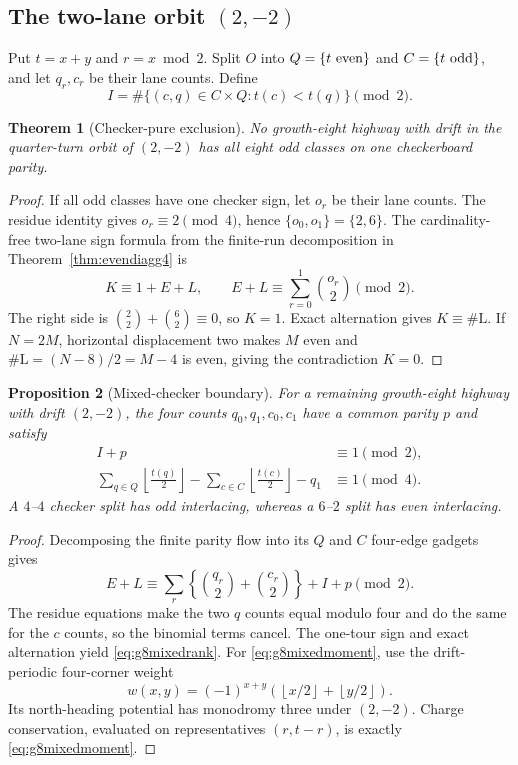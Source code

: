 \documentclass[11pt,letterpaper]{article}
\theoremstyle{plain}
\newtheorem{theorem}{Theorem}[section]
\newtheorem{proposition}[theorem]{Proposition}
\theoremstyle{definition}
\newcommand{\turnL}{\mathrm{L}}
\begin{document}
\begin{NoHyper}
\subsection{The two-lane orbit \texorpdfstring{$(2,-2)$}{(2,-2)}}

Put $t=x+y$ and $r=x\bmod2$.  Split $O$ into
$Q=\{t\ {\rm even}\}$ and $C=\{t\ {\rm odd}\}$, and let $q_r,c_r$ be their lane
counts.  Define
\[
 I=\#\{(c,q)\in C\times Q:t(c)<t(q)\}\pmod2.
\]

\begin{theorem}[Checker-pure exclusion]\label{thm:g8checkerpure}
No growth-eight highway with drift in the quarter-turn orbit of $(2,-2)$ has all
eight odd classes on one checkerboard parity.
\end{theorem}

\begin{proof}
If all odd classes have one checker sign, let $o_r$ be their lane counts.
The residue identity gives $o_r\equiv2\pmod4$, hence
$\{o_0,o_1\}=\{2,6\}$.  The cardinality-free two-lane sign formula from the
finite-run decomposition in Theorem~\ref{thm:evendiagg4} is
\[
 K\equiv1+E+L,\qquad E+L\equiv\sum_{r=0}^{1}\binom{o_r}{2}\pmod2 .
\]
The right side is $\binom22+\binom62\equiv0$, so $K=1$.  Exact alternation gives
$K\equiv\#\turnL$.  If $N=2M$, horizontal displacement two makes $M$ even and
$\#\turnL=(N-8)/2=M-4$ is even, giving the contradiction $K=0$.
\end{proof}

\begin{proposition}[Mixed-checker boundary]\label{prop:g8mixed}
For a remaining growth-eight highway with drift $(2,-2)$, the four counts
$q_0,q_1,c_0,c_1$ have a common parity $p$ and satisfy
\begin{align}
 I+p&\equiv1\pmod2,\label{eq:g8mixedrank}\\
 \sum_{q\in Q}\left\lfloor\frac{t(q)}2\right\rfloor
 -\sum_{c\in C}\left\lfloor\frac{t(c)}2\right\rfloor-q_1
 &\equiv1\pmod4.\label{eq:g8mixedmoment}
\end{align}
A $4$--$4$ checker split has odd interlacing, whereas a $6$--$2$ split has
even interlacing.
\end{proposition}

\begin{proof}
Decomposing the finite parity flow into its $Q$ and $C$ four-edge gadgets gives
\[
 E+L\equiv\sum_r\left\{\binom{q_r}{2}+\binom{c_r}{2}\right\}+I+p\pmod2.
\]
The residue equations make the two $q$ counts equal modulo four and do the same
for the $c$ counts, so the binomial terms cancel.  The one-tour sign and exact
alternation yield \eqref{eq:g8mixedrank}.  For
\eqref{eq:g8mixedmoment}, use the drift-periodic four-corner weight
\[
 w(x,y)=(-1)^{x+y}
 \left(\left\lfloor x/2\right\rfloor+\left\lfloor y/2\right\rfloor\right).
\]
Its north-heading potential has monodromy three under $(2,-2)$.
Charge conservation, evaluated on representatives $(r,t-r)$, is exactly
\eqref{eq:g8mixedmoment}.
\end{proof}


\end{NoHyper}
\end{document}
